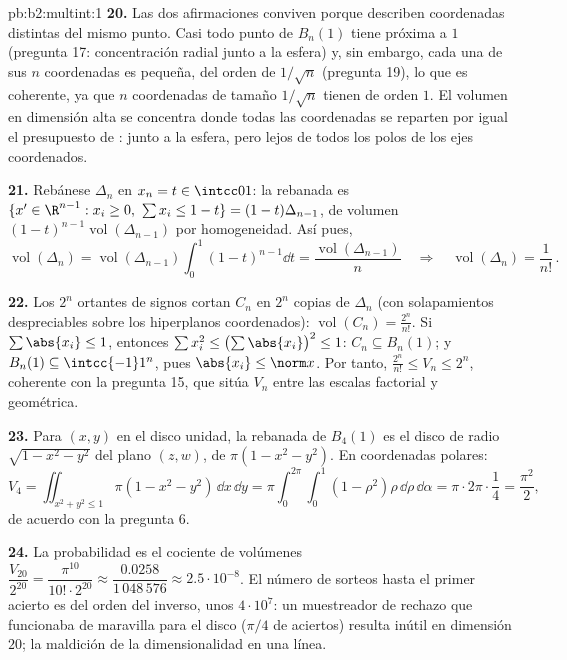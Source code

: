 \begin{solution}{pb:b2:multint:1}
\textbf{20.} Las dos afirmaciones conviven porque describen
coordenadas distintas del mismo punto. Casi todo punto de $B_n(1)$
tiene  próxima a $1$ (pregunta 17: concentración radial junto a
la esfera) y, sin embargo, cada una de sus $n$ coordenadas es
pequeña, del orden de $1/\sqrt n$ (pregunta 19), lo que es coherente,
ya que $n$ coordenadas de tamaño $1/\sqrt n$ tienen  de orden
$1$. El volumen en dimensión alta se concentra donde todas las
coordenadas se reparten por igual el presupuesto de : junto a la
esfera, pero lejos de todos los polos de los ejes coordenados.

\textbf{21.} Rebánese $\Delta_n$ en $x_n = t \in \intcc01$: la
rebanada es $\{x' \in \R^{n-1} : x_i \geq 0,\ \sum x_i \leq 1 - t\} =
(1-t)\Delta_{n-1}$, de volumen
$(1-t)^{n-1}\operatorname{vol}(\Delta_{n-1})$ por homogeneidad. Así
pues,
\[
\operatorname{vol}(\Delta_n) =
\operatorname{vol}(\Delta_{n-1})\int_0^1(1 - t)^{n-1}\dd t =
\frac{\operatorname{vol}(\Delta_{n-1})}{n}
\quad\Longrightarrow\quad
\operatorname{vol}(\Delta_n) = \frac1{n!}\,.
\]

\textbf{22.} Los $2^n$ ortantes de signos cortan $C_n$ en $2^n$
copias de $\Delta_n$ (con solapamientos despreciables sobre los
hiperplanos coordenados): $\operatorname{vol}(C_n) =
\frac{2^n}{n!}$. Si $\sum\abs{x_i} \leq 1$, entonces $\sum x_i^2 \leq
\bigl(\sum\abs{x_i}\bigr)^2 \leq 1$: $C_n \subseteq B_n(1)$; y
$B_n(1) \subseteq \intcc{-1}1^n$, pues $\abs{x_i} \leq \norm x$. Por
tanto, $\frac{2^n}{n!} \leq V_n \leq 2^n$, coherente con la pregunta
15, que sitúa $V_n$ entre las escalas factorial y geométrica.

\textbf{23.} Para $(x, y)$ en el disco unidad, la rebanada de
$B_4(1)$ es el disco de radio $\sqrt{1 - x^2 - y^2}$ del plano $(z,
w)$, de  $\pi(1 - x^2 - y^2)$. En coordenadas polares:
\[
V_4 = \iint_{x^2+y^2\leq1}\pi(1 - x^2 - y^2)\,\dd x\,\dd y
= \pi\int_0^{2\pi}\!\!\int_0^1(1 - \rho^2)\rho\,
\dd\rho\,\dd\alpha
= \pi\cdot2\pi\cdot\frac14 = \frac{\pi^2}2 ,
\]
de acuerdo con la pregunta 6.

\textbf{24.} La probabilidad es el cociente de volúmenes
$\dfrac{V_{20}}{2^{20}} = \dfrac{\pi^{10}}{10!\cdot2^{20}} \approx
\dfrac{0.0258}{1\,048\,576} \approx 2.5\cdot10^{-8}$. El número de
sorteos hasta el primer acierto es del orden del inverso, unos
$4\cdot10^7$: un muestreador de rechazo que funcionaba de maravilla
para el disco ($\pi/4$ de aciertos) resulta inútil en dimensión
$20$; la maldición de la dimensionalidad en una línea.


\end{solution}

